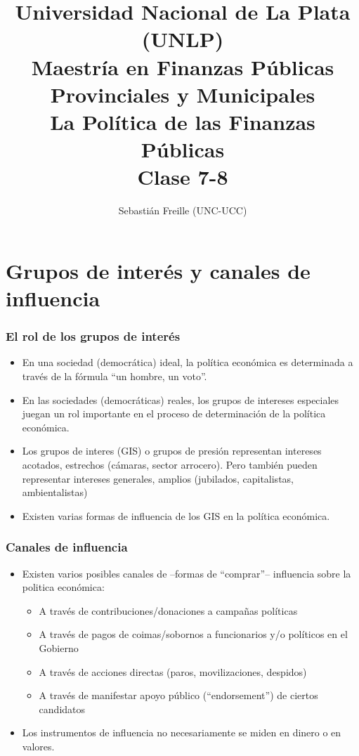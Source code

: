 \documentclass[handout,final,xcolor=dvipsnames]{beamer}
\author{Sebastián Freille (UNC-UCC)}
\title{Universidad Nacional de La Plata (UNLP) \\
  Maestría en Finanzas Públicas Provinciales y Municipales \\ La
  Política de las Finanzas Públicas \\ Clase 7-8}
\date{}
\institute{}
\begin{document}
\maketitle


\section{Grupos de interés y canales de influencia}

\begin{frame}\frametitle{El rol de los grupos de interés}
\begin{itemize}\itemsep 15pt
\item En una sociedad (democrática) ideal, la política económica es determinada a
  través de la fórmula ``un hombre, un voto''.
\item En las sociedades (democráticas) reales, los grupos de intereses
  especiales juegan un rol importante en el proceso de determinación
  de la política económica.
\item Los grupos de interes (GIS) o grupos de presión representan
  intereses acotados, estrechos (cámaras, sector arrocero). Pero también pueden representar
  intereses generales, amplios (jubilados, capitalistas, ambientalistas)
\item Existen varias formas de influencia de los GIS en la política
  económica.
\end{itemize}
\end{frame}


\begin{frame}\frametitle{Canales de influencia}
\begin{itemize}\itemsep 15pt \medskip
\item Existen varios posibles canales de --formas de ``comprar''-- influencia sobre la politica
  económica:
\begin{itemize}\itemsep 15pt \medskip 
\item A través de contribuciones/donaciones a campañas políticas
\item A través de pagos de coimas/sobornos a funcionarios y/o
  políticos en el Gobierno
\item A través de acciones directas (paros, movilizaciones, despidos)
\item A través de manifestar apoyo público (``endorsement'') de
  ciertos candidatos
\end{itemize}
\item Los instrumentos de influencia no necesariamente se miden en
  dinero o en valores.
\end{itemize}
\end{frame}
\end{document}
